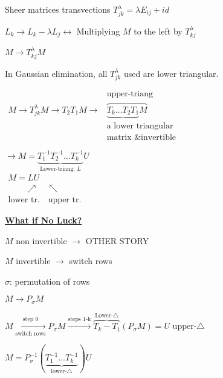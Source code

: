 \documentclass{article}
\begin{document}
\vspace{10pt}

Sheer matrices transvections
$T^\lambda_{jk} = \lambda E_{ij} + id$

$L_k \rightarrow L_k - \lambda L_j \longleftrightarrow$ Multiplying $M$ to the left by $T^\lambda_{kj}$

$M\rightarrow T^\lambda_{kj}M$

In Gaussian elimination, all $T^\lambda_{jk}$ used are lower triangular.

$\begin{array}{cc}
    & \text{upper-triang} \\
    M\rightarrow T^\lambda_{jk}M\rightarrow T_2 T_1 M\rightarrow & \overbrace{\underbrace{T_k\ldots T_2 T_1} M}\\
     & \text{a lower triangular} \\
     & \text{matrix \& invertible}
\end{array}$

\vspace{10pt}

$\rightarrow M = \underbrace{T^{-1}_1 T^{-1}_2\ldots T_k^{-1}}_{\text{Lower-triang. } L} U$ \\
$\begin{array}{cc}
     M = L U \\
     \qquad\nearrow\quad \nwarrow \\
     \text{lower tr.} \quad \text{upper tr.}
\end{array}$

\vspace{10pt}

\underline{\textbf{What if No Luck?}}

$M$ non invertible $\rightarrow$ OTHER STORY

$M$ invertible $\rightarrow$ switch rows

\vspace{2pt}

$\sigma$: permutation of rows

$M\rightarrow P_\sigma M$

$M\displaystyle\xrightarrow[\text{switch rows}]{\text{step 0}} P_\sigma M \xrightarrow[]{\text{steps 1-k}} \overbrace{T_k - T_1}^{\text{Lower-}\triangle}(P_\sigma M) = U \text{ upper-}\triangle$

\vspace{6pt}

$M=P^{-1}_\sigma (\underbrace{T_1^{-1}\ldots T_k^{-1}}_{\text{lower-}\triangle})U$
\end{document}

